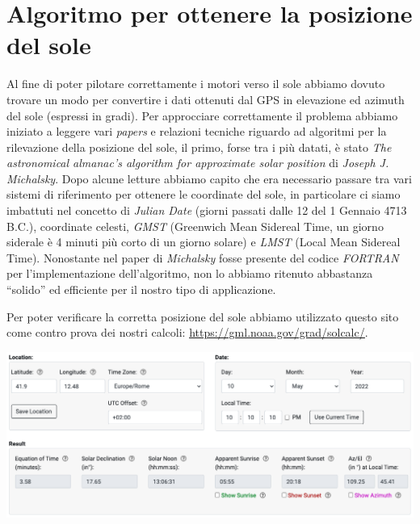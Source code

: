 \hypertarget{algoritmo-per-ottenere-la-posizione-del-sole}{%
\section{Algoritmo per ottenere la posizione del
sole}\label{algoritmo-per-ottenere-la-posizione-del-sole}}

Al fine di poter pilotare correttamente i motori verso il sole abbiamo
dovuto trovare un modo per convertire i dati ottenuti dal GPS in
elevazione ed azimuth del sole (espressi in gradi). Per approcciare
correttamente il problema abbiamo iniziato a leggere vari \emph{papers}
e relazioni tecniche riguardo ad algoritmi per la rilevazione della
posizione del sole, il primo, forse tra i più datati, è stato \emph{The
astronomical almanac's algorithm for approximate solar position} di
\emph{Joseph J. Michalsky}. Dopo alcune letture abbiamo capito che era
necessario passare tra vari sistemi di riferimento per ottenere le
coordinate del sole, in particolare ci siamo imbattuti nel concetto di
\emph{Julian Date} (giorni passati dalle 12 del 1 Gennaio 4713 B.C.),
coordinate celesti, \emph{GMST} (Greenwich Mean Sidereal Time, un giorno
siderale è 4 minuti più corto di un giorno solare) e \emph{LMST} (Local
Mean Sidereal Time). Nonostante nel paper di \emph{Michalsky} fosse
presente del codice \emph{FORTRAN} per l'implementazione dell'algoritmo,
non lo abbiamo ritenuto abbastanza ``solido'' ed efficiente per il
nostro tipo di applicazione.

Per poter verificare la corretta posizione del sole abbiamo utilizzato
questo sito come contro prova dei nostri calcoli:
\href{https://gml.noaa.gov/grad/solcalc/}{\underline{https://gml.noaa.gov/grad/solcalc/}}.

\begin{center}
\includegraphics[scale=0.4]{figures/image72.png}
\captionsetup{type=figure}
\end{center}

